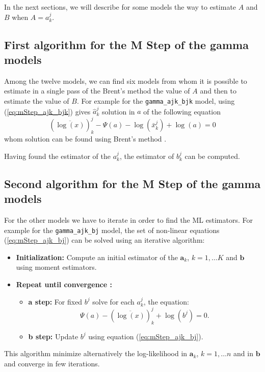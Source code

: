 \documentclass[a4paper,10pt]{article}
\newcommand{\ba}{\mathbf{a}}
\newcommand{\bb}{\mathbf{b}}
\begin{document}
In the next sections, we will describe for some models the way to estimate $A$ and $B$
when $A = a^j_k$.

\subsection{First algorithm for the M Step of the gamma models}
Among the twelve models, we can find six models from whom it is possible to estimate in
a single pass of the Brent's method the value of $A$ and then to estimate the value of $B$.
For example for the \verb+gamma_ajk_bjk+ model, using (\ref{eq:mStep_ajk_bjk}) gives
$\hat{a}^j_k$ solution in $a$ of the following equation
\begin{equation}\label{eq:mStep_ajk_bjk_zero}
  (\overline{\log(x)})^j_k - \Psi(a) - \log(\bar{x}^j_k) + \log(a) =0
\end{equation}
whom solution can be found using Brent's method \cite{Brent1973}.

Having found the estimator of the $a^j_k$, the estimator of $b^j_k$ can be computed.

\subsection{Second algorithm for the M Step of the gamma models}
For the other models we have to iterate in order to find the ML estimators.
For example for the \verb+gamma_ajk_bj+ model, the set of non-linear equations
(\ref{eq:mStep_ajk_bj}) can be solved using an iterative algorithm:
\begin{itemize}
\item {\bf Initialization:} Compute an initial estimator of the $\ba_k$, $k=1,\ldots K$ and $\bb$
using moment estimators.
\item {\bf Repeat until convergence :}
\begin{itemize}
\item {\bf a step:} For fixed $b^j$ solve for each $a^j_k$, the equation:
\begin{equation*}
  \Psi(a) - (\overline{\log(x)})^j_k + \log(b^j) = 0.
\end{equation*}
\item {\bf b step:} Update $b^j$ using equation (\ref{eq:mStep_ajk_bj}).
\end{itemize}
\end{itemize}

This algorithm minimize alternatively the log-likelihood in $\ba_k$, $k=1,\ldots n$ and in
$\bb$ and converge in few iterations.
\end{document}
